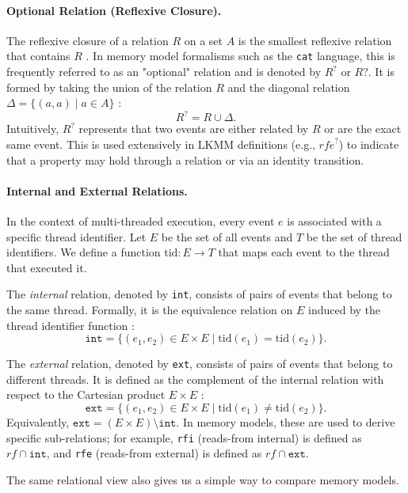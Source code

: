 \paragraph{Optional Relation (Reflexive Closure).}
The reflexive closure of a relation $R$ on a set $A$ is the smallest reflexive relation that contains $R$ \citep[p.~628]{rosen2012discrete}. In memory model formalisms such as the \texttt{cat} language, this is frequently referred to as an "optional" relation and is denoted by $R^?$ or $R?$. It is formed by taking the union of the relation $R$ and the diagonal relation $\Delta = \{(a, a) \mid a \in A\}$ \citep[p.~628]{rosen2012discrete}:
\[
R^? = R \cup \Delta.
\]
Intuitively, $R^?$ represents that two events are either related by $R$ or are the exact same event. This is used extensively in LKMM definitions (e.g., $\mathit{rfe}^?$) to indicate that a property may hold through a relation or via an identity transition.

\paragraph{Internal and External Relations.}
In the context of multi-threaded execution, every event $e$ is associated with a specific thread identifier. Let $E$ be the set of all events and $T$ be the set of thread identifiers. We define a function $\text{tid}: E \to T$ that maps each event to the thread that executed it.

The \emph{internal} relation, denoted by \texttt{int}, consists of pairs of events that belong to the same thread. Formally, it is the equivalence relation on $E$ induced by the thread identifier function \citep[p.~642]{rosen2012discrete}:
\[
\texttt{int} = \{ (e_1, e_2) \in E \times E \mid \text{tid}(e_1) = \text{tid}(e_2) \}.
\]

The \emph{external} relation, denoted by \texttt{ext}, consists of pairs of events that belong to different threads. It is defined as the complement of the internal relation with respect to the Cartesian product $E \times E$ \citep[p.~602]{rosen2012discrete}:
\[
\texttt{ext} = \{ (e_1, e_2) \in E \times E \mid \text{tid}(e_1) \neq \text{tid}(e_2) \}.
\]
Equivalently, $\texttt{ext} = (E \times E) \setminus \texttt{int}$. In memory models, these are used to derive specific sub-relations; for example, \texttt{rfi} (reads-from internal) is defined as $\mathit{rf} \cap \texttt{int}$, and \texttt{rfe} (reads-from external) is defined as $\mathit{rf} \cap \texttt{ext}$.

The same relational view also gives us a simple way to compare memory models.

